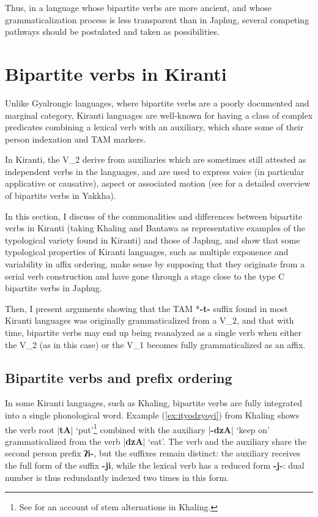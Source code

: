\documentclass[oneside,a4paper,11pt]{article}
\newcommand{\ipa}[1]{{\phon\textbf{#1}}}
\newcommand{\dhatu}[2]{|\ipa{#1}| `#2'}
\begin{document}
Thus, in a language whose bipartite verbs are more ancient, and whose grammaticalization process is less transparent than in Japhug, several competing pathways should be postulated and taken as possibilities.

\section{Bipartite verbs in Kiranti} \label{sec:kiranti.bipart}
Unlike Gyalrongic languages, where bipartite verbs are a poorly documented and marginal category, Kiranti languages are well-known for having a class of complex predicates combining a lexical verb with an auxiliary, which share some of their person indexation and TAM markers. 

In Kiranti, the V_2 derive from auxiliaries which are sometimes still attested as independent verbs in the languages, and are used to express voice (in particular applicative or causative), aspect or associated motion (see \citealt[283-328]{schackow15yakkha} for a detailed overview of bipartite verbs in Yakkha).

In this section, I discuss of the commonalities and differences between bipartite verbs in Kiranti (taking Khaling and Bantawa as representative examples of the typological variety found in Kiranti) and those of Japhug, and show that some typological properties of Kiranti languages, such as multiple exponence and variability in affix ordering, make sense by supposing that they originate from a serial verb construction and have gone through a stage close to the type C bipartite verbs in Japhug.

 Then, I present arguments showing that the TAM *\ipa{-t-} suffix found in most Kiranti languages was originally grammaticalized from a V_2, and that with time, bipartite verbs may end up being reanalyzed as a single verb when either the V_2 (as in this case) or the V_1 becomes fully grammaticalized as an affix.

\subsection{Bipartite verbs and prefix ordering}
In some Kiranti languages, such as Khaling, bipartite verbs are fully integrated into a single phonological word.  Example (\ref{ex:ityodzyoyi}) from Khaling shows the verb root \dhatu{tA}{put}\footnote{See \citet{jacques12khaling} for an account of stem alternations in Khaling.} combined with the auxiliary \dhatu{-dzA}{keep on} grammaticalized from the verb \dhatu{dzA}{eat}. The verb and the auxiliary share the second person prefix \ipa{ʔi-}, but the suffixes remain distinct: the auxiliary receives the full form of the suffix \ipa{-ji}, while the lexical verb has a reduced form \ipa{-j-}: dual number is thus redundantly indexed two times in this form.
\end{document}
